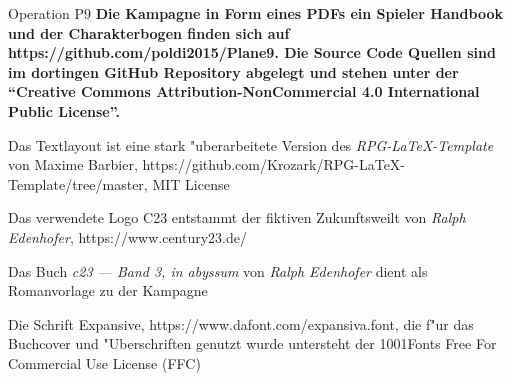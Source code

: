 \newpage
\pagestyle{empty}


\begin{description}
    \item {Operation P9} \textbf{Die Kampagne in Form eines PDFs ein Spieler Handbook und der Charakterbogen finden sich auf    
        https://github.com/poldi2015/Plane9. Die Source Code Quellen sind im dortingen GitHub Repository abgelegt und stehen
        unter der "`Creative Commons Attribution-NonCommercial 4.0 International Public License"'.}
    \item [LaTeX Vorlage] Das Textlayout ist eine stark "uberarbeitete Version des \textit{RPG-LaTeX-Template} von 
        Maxime Barbier, https://github.com/Krozark/RPG-LaTeX-Template/tree/master, MIT License
    \item [Logo C23] Das verwendete Logo C23 entstammt der fiktiven Zukunftsweilt von \emph{Ralph  Edenhofer}, 
        \newline{}https://www.century23.de/
    \item [Romanvorlage] Das Buch \emph{c23 --- Band 3, in abyssum} von \emph{Ralph  Edenhofer} dient als Romanvorlage 
        zu der Kampagne
    \item [Schriftart] Die Schrift Expansive, https://www.dafont.com/expansiva.font, die f"ur das Buchcover und 
        "Uberschriften genutzt wurde untersteht der 1001Fonts Free For Commercial Use License (FFC)    
\end{description}